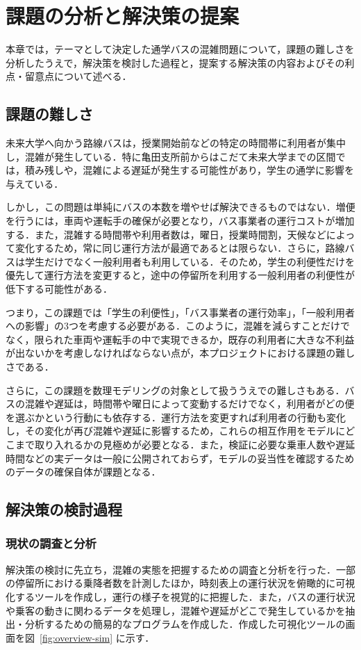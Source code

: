 \chapter{課題の分析と解決策の提案}
本章では，テーマとして決定した通学バスの混雑問題について，課題の難しさを分析したうえで，解決策を検討した過程と，提案する解決策の内容およびその利点・留意点について述べる．

\section{課題の難しさ}
未来大学へ向かう路線バスは，授業開始前などの特定の時間帯に利用者が集中し，混雑が発生している．特に亀田支所前からはこだて未来大学までの区間では，積み残しや，混雑による遅延が発生する可能性があり，学生の通学に影響を与えている．

しかし，この問題は単純にバスの本数を増やせば解決できるものではない．増便を行うには，車両や運転手の確保が必要となり，バス事業者の運行コストが増加する．また，混雑する時間帯や利用者数は，曜日，授業時間割，天候などによって変化するため，常に同じ運行方法が最適であるとは限らない．さらに，路線バスは学生だけでなく一般利用者も利用している．そのため，学生の利便性だけを優先して運行方法を変更すると，途中の停留所を利用する一般利用者の利便性が低下する可能性がある．

つまり，この課題では「学生の利便性」，「バス事業者の運行効率」，「一般利用者への影響」の3つを考慮する必要がある．このように，混雑を減らすことだけでなく，限られた車両や運転手の中で実現できるか，既存の利用者に大きな不利益が出ないかを考慮しなければならない点が，本プロジェクトにおける課題の難しさである．

さらに，この課題を数理モデリングの対象として扱ううえでの難しさもある．バスの混雑や遅延は，時間帯や曜日によって変動するだけでなく，利用者がどの便を選ぶかという行動にも依存する．運行方法を変更すれば利用者の行動も変化し，その変化が再び混雑や遅延に影響するため，これらの相互作用をモデルにどこまで取り入れるかの見極めが必要となる．また，検証に必要な乗車人数や遅延時間などの実データは一般に公開されておらず，モデルの妥当性を確認するためのデータの確保自体が課題となる．

\section{解決策の検討過程}

\subsection{現状の調査と分析}
解決策の検討に先立ち，混雑の実態を把握するための調査と分析を行った．一部の停留所における乗降者数を計測したほか，時刻表上の運行状況を俯瞰的に可視化するツールを作成し，運行の様子を視覚的に把握した．また，バスの運行状況や乗客の動きに関わるデータを処理し，混雑や遅延がどこで発生しているかを抽出・分析するための簡易的なプログラムを作成した．作成した可視化ツールの画面を図~\ref{fig:overview-sim} に示す．

